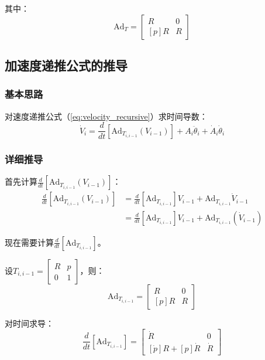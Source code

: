 \documentclass[12pt,a4paper]{article}
\begin{document}
其中：
\begin{equation}
\text{Ad}_T = \begin{bmatrix}
R & 0 \\
[p]R & R
\end{bmatrix}
\end{equation}

\subsection{加速度递推公式的推导}

\subsubsection{基本思路}

对速度递推公式（\ref{eq:velocity_recursive}）求时间导数：
\begin{equation}
\dot{V}_i = \frac{d}{dt}[\text{Ad}_{T_{i,i-1}}(V_{i-1})] + A_i \ddot{\theta}_i + \dot{A}_i \dot{\theta}_i
\end{equation}

\subsubsection{详细推导}

首先计算$\frac{d}{dt}[\text{Ad}_{T_{i,i-1}}(V_{i-1})]$：
\begin{align}
\frac{d}{dt}[\text{Ad}_{T_{i,i-1}}(V_{i-1})] &= \frac{d}{dt}[\text{Ad}_{T_{i,i-1}}] V_{i-1} + \text{Ad}_{T_{i,i-1}} \dot{V}_{i-1} \\
&= \frac{d}{dt}[\text{Ad}_{T_{i,i-1}}] V_{i-1} + \text{Ad}_{T_{i,i-1}}(\dot{V}_{i-1})
\end{align}

现在需要计算$\frac{d}{dt}[\text{Ad}_{T_{i,i-1}}]$。

设$T_{i,i-1} = \begin{bmatrix} R & p \\ 0 & 1 \end{bmatrix}$，则：
\begin{equation}
\text{Ad}_{T_{i,i-1}} = \begin{bmatrix}
R & 0 \\
[p]R & R
\end{bmatrix}
\end{equation}

对时间求导：
\begin{equation}
\frac{d}{dt}[\text{Ad}_{T_{i,i-1}}] = \begin{bmatrix}
\dot{R} & 0 \\
[\dot{p}]R + [p]\dot{R} & \dot{R}
\end{bmatrix}
\end{equation}
\end{document}
